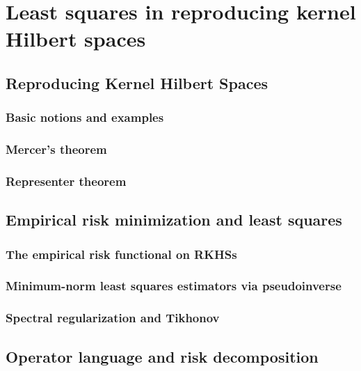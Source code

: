 \chapter{Least squares in reproducing kernel Hilbert spaces}

\section{Reproducing Kernel Hilbert Spaces}
\subsection{Basic notions and examples}
\subsection{Mercer's theorem}
\subsection{Representer theorem}

\section{Empirical risk minimization and least squares}
\subsection{The empirical risk functional on RKHSs}
\subsection{Minimum-norm least squares estimators via pseudoinverse}
\subsection{Spectral regularization and Tikhonov}

\section{Operator language and risk decomposition}